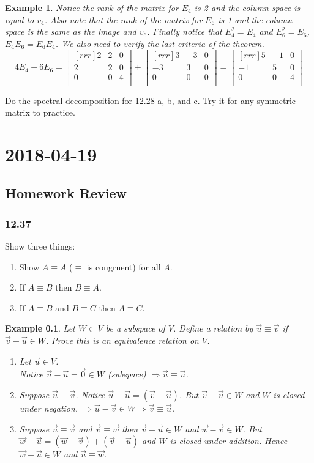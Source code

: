 \documentclass{report}
\newtheorem*{ex}{Example}
\newcommand{\mychapter}[2]{
	\setcounter{chapter}{#1}
	\setcounter{section}{0}
	\chapter*{#2}
	\addcontentsline{toc}{chapter}{#2}
}
\begin{document}
\begin{ex}
Notice the rank of the matrix for $E_4$ is 2 and the column space is equal to $v_4$. Also note that the rank of the matrix for $E_6$ is 1 and the column space is the same as the image and $v_6$. Finally notice that $E_4^2=E_4$ and $E_6^2=E_6$, $E_4E_6=E_6E_4$. We also need to verify the last criteria of the theorem.
\[ 4E_4+6E_6 = \begin{bmatrix}[rrr]2&2&0\\2&2&0\\0&0&4\\\end{bmatrix}+\begin{bmatrix}[rrr]3&-3&0\\-3&3&0\\0&0&0\\\end{bmatrix} = \begin{bmatrix}[rrr]5&-1&0\\-1&5&0\\0&0&4\\\end{bmatrix} \]
\end{ex}
Do the spectral decomposition for 12.28 a, b, and c. Try it for any symmetric matrix to practice.


\mychapter{42}{2018-04-19}
\section{Homework Review}
\subsection{12.37}
Show three things:
\begin{enumerate}
\item[(i)] Show $A\equiv A$ ($\equiv$ is congruent) for all $A$.
\item[(ii)] If $A\equiv B$ then $B\equiv A$.
\item[(iii)] If $A\equiv B$ and $B\equiv C$ then $A\equiv C$.
\end{enumerate}
\begin{ex}
Let $W\subset V$ be a subspace of $V$. Define a relation by $\vec{u}\equiv\vec{v}$ if $\vec{v}-\vec{u}\in W$. Prove this is an equivalence relation on $V$.
\begin{enumerate}
\item[(i)]Let $\vec{u}\in V$.\\
Notice $\vec{u}-\vec{u}=\vec{0}\in W$ (subspace) $\Rightarrow \vec{u}\equiv \vec{u}$.
\item[(ii)]Suppose $\vec{u}\equiv\vec{v}$. Notice $\vec{u}-\vec{u}=(\vec{v}-\vec{u})$. But $\vec{v}-\vec{u}\in W$ and $W$ is closed under negation. $\Rightarrow \vec{u}-\vec{v}\in W \Rightarrow \vec{v}\equiv \vec{u}$.
\item[(iii)]Suppose $\vec{u}\equiv \vec{v}$ and $\vec{v}\equiv\vec{w}$ then $\vec{v}-\vec{u}\in W$ and $\vec{w}-\vec{v}\in W$. But $\vec{w}-\vec{u} = (\vec{w}-\vec{v})+(\vec{v}-\vec{u})$ and $W$ is closed under addition. Hence $\vec{w}-\vec{u}\in W$ and $\vec{u}\equiv\vec{w}$.
\end{enumerate}
\end{ex}
\end{document}
